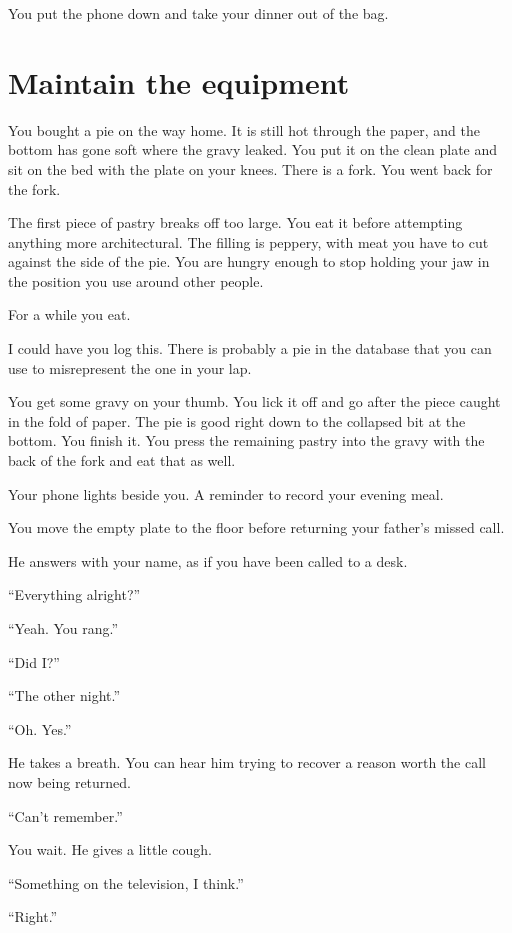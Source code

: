 \documentclass[11pt,oneside]{book}
\begin{document}
You put the phone down and take your dinner out of the bag.

\section*{Maintain the equipment}

You bought a pie on the way home. It is still hot through the paper, and the bottom has gone soft where the gravy leaked. You put it on the clean plate and sit on the bed with the plate on your knees. There is a fork. You went back for the fork.

The first piece of pastry breaks off too large. You eat it before attempting anything more architectural. The filling is peppery, with meat you have to cut against the side of the pie. You are hungry enough to stop holding your jaw in the position you use around other people.

For a while you eat.

I could have you log this. There is probably a pie in the database that you can use to misrepresent the one in your lap.

You get some gravy on your thumb. You lick it off and go after the piece caught in the fold of paper. The pie is good right down to the collapsed bit at the bottom. You finish it. You press the remaining pastry into the gravy with the back of the fork and eat that as well.

Your phone lights beside you. A reminder to record your evening meal.

You move the empty plate to the floor before returning your father's missed call.

He answers with your name, as if you have been called to a desk.

``Everything alright?''

``Yeah. You rang.''

``Did I?''

``The other night.''

``Oh. Yes.''

He takes a breath. You can hear him trying to recover a reason worth the call now being returned.

``Can't remember.''

You wait. He gives a little cough.

``Something on the television, I think.''

``Right.''
\end{document}

